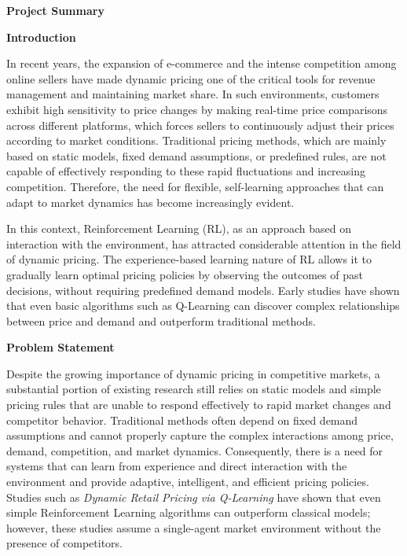 \documentclass[11pt,a4paper]{article}
\begin{document}
\begin{tcolorbox}
\textbf{\large Project Summary}

\vspace{0.2cm}
\textbf{\large Introduction}

In recent years, the expansion of e-commerce and the intense competition among online sellers have made dynamic pricing one of the critical tools for revenue management and maintaining market share. In such environments, customers exhibit high sensitivity to price changes by making real-time price comparisons across different platforms, which forces sellers to continuously adjust their prices according to market conditions. Traditional pricing methods, which are mainly based on static models, fixed demand assumptions, or predefined rules, are not capable of effectively responding to these rapid fluctuations and increasing competition. Therefore, the need for flexible, self-learning approaches that can adapt to market dynamics has become increasingly evident.

In this context, Reinforcement Learning (RL), as an approach based on interaction with the environment, has attracted considerable attention in the field of dynamic pricing. The experience-based learning nature of RL allows it to gradually learn optimal pricing policies by observing the outcomes of past decisions, without requiring predefined demand models. Early studies have shown that even basic algorithms such as Q-Learning can discover complex relationships between price and demand and outperform traditional methods.

\vspace{0.3cm}
\textbf{\large Problem Statement}

Despite the growing importance of dynamic pricing in competitive markets, a substantial portion of existing research still relies on static models and simple pricing rules that are unable to respond effectively to rapid market changes and competitor behavior. Traditional methods often depend on fixed demand assumptions and cannot properly capture the complex interactions among price, demand, competition, and market dynamics. Consequently, there is a need for systems that can learn from experience and direct interaction with the environment and provide adaptive, intelligent, and efficient pricing policies. Studies such as \textit{Dynamic Retail Pricing via Q-Learning} have shown that even simple Reinforcement Learning algorithms can outperform classical models; however, these studies assume a single-agent market environment without the presence of competitors.


\end{tcolorbox}
\end{document}
